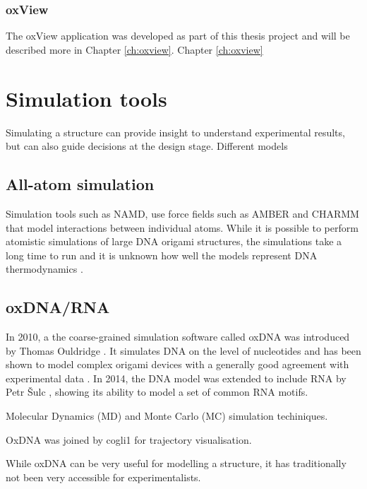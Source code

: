 \subsubsection{oxView}
The oxView application was developed as part of this thesis project and will be described more in Chapter \ref{ch:oxview}.
Chapter \ref{ch:oxview}

\section{Simulation tools}
Simulating a structure can provide insight to understand experimental results, but can also guide decisions at the design stage. Different models

\subsection{All-atom simulation}
Simulation tools such as NAMD\cite{NAMDphillips2005scalable}, use force fields such as AMBER\cite{AMBERcornell1996second} and CHARMM \cite{brooks1983charmm} that model interactions between individual atoms. While it is possible to perform atomistic simulations of large DNA origami structures\cite{yoo2013situ}, the simulations take a long time to run and it is unknown how well the models represent DNA thermodynamics \cite{sengar2021primer}.

\subsection{oxDNA/RNA}
In 2010, a the coarse-grained simulation software called oxDNA was introduced by Thomas Ouldridge \cite{ouldridge2010dna}. It simulates DNA on the level of nucleotides and has been shown to model complex origami devices with a generally good agreement with experimental data \cite{sharma2017characterizing}. In 2014, the DNA model was extended to include RNA by Petr {\v{S}}ulc \cite{vsulc2014nucleotide}, showing its ability to model a set of common RNA motifs. 

Molecular Dynamics (MD) and Monte Carlo (MC) simulation techiniques.

OxDNA was joined by cogli1 for trajectory visualisation.



While oxDNA can be very useful for modelling a structure, it has traditionally not been very accessible for experimentalists. %

